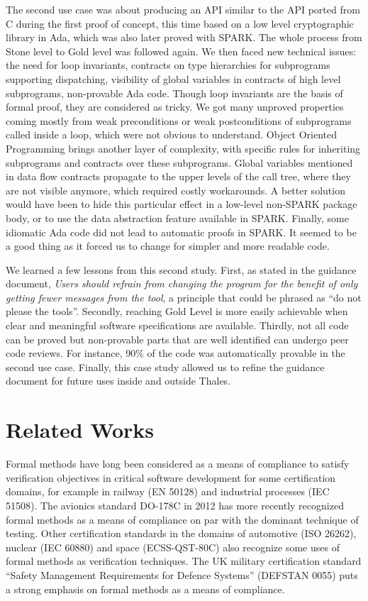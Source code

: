 \documentclass{llncs}
\begin{document}
The second use case was about producing an API similar to the API ported from C
during the first proof of concept, this time based on a low level cryptographic
library in Ada, which was also later proved with SPARK. The whole process from
Stone level to Gold level was followed again. We then faced new technical
issues: the need for loop invariants, contracts on type hierarchies for
subprograms supporting dispatching, visibility of global variables in contracts
of high level subprograms, non-provable Ada code. Though loop invariants are
the basis of formal proof, they are considered as tricky. We got many unproved
properties coming mostly from weak preconditions or weak postconditions of
subprograms called inside a loop, which were not obvious to understand. Object
Oriented Programming brings another layer of complexity, with specific rules
for inheriting subprograms and contracts over these subprograms. Global
variables mentioned in data flow contracts propagate to the upper levels of the
call tree, where they are not visible anymore, which required costly
workarounds. A better solution would have been to hide this particular effect
in a low-level non-SPARK package body, or to use the data abstraction feature
available in SPARK. Finally, some idiomatic Ada code did not lead to automatic
proofs in SPARK. It seemed to be a good thing as it forced us to change for
simpler and more readable code.

We learned a few lessons from this second study. First, as stated in the
guidance document, \textit{Users should refrain from changing the program for
  the benefit of only getting fewer messages from the tool}, a principle that
could be phrased as ``do not please the tools''. Secondly, reaching Gold Level
is more easily achievable when clear and meaningful software specifications are
available. Thirdly, not all code can be proved but non-provable parts that are
well identified can undergo peer code reviews. For instance, 90\% of the code
was automatically provable in the second use case. Finally, this case study
allowed us to refine the guidance document for future uses inside and outside
Thales.

\section{Related Works}

Formal methods have long been considered as a means of compliance to satisfy
verification objectives in critical software development for some certification
domains, for example in railway (EN 50128) and industrial processes (IEC
51508). The avionics standard DO-178C in 2012 has more recently recognized
formal methods as a means of compliance on par with the dominant technique of
testing. Other certification standards in the domains of automotive (ISO
26262), nuclear (IEC 60880) and space (ECSS-QST-80C) also recognize some uses
of formal methods as verification techniques. The UK military certification
standard ``Safety Management Requirements for Defence Systems'' (DEFSTAN 0055)
puts a strong emphasis on formal methods as a means of compliance.
\end{document}

